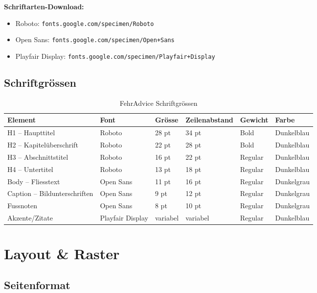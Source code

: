 \textbf{Schriftarten-Download:}
\begin{itemize}
    \item Roboto: \texttt{fonts.google.com/specimen/Roboto}
    \item Open Sans: \texttt{fonts.google.com/specimen/Open+Sans}
    \item Playfair Display: \texttt{fonts.google.com/specimen/Playfair+Display}
\end{itemize}

\subsection{Schriftgrössen}

\begin{table}[h]
\centering
\caption{FehrAdvice Schriftgrössen}
\label{tab:font-sizes}
\begin{tabular}{llllll}
\toprule
\textbf{Element} & \textbf{Font} & \textbf{Grösse} & \textbf{Zeilenabstand} & \textbf{Gewicht} & \textbf{Farbe} \\
\midrule
H1 – Haupttitel & Roboto & 28 pt & 34 pt & Bold & Dunkelblau \\
H2 – Kapitelüberschrift & Roboto & 22 pt & 28 pt & Bold & Dunkelblau \\
H3 – Abschnittstitel & Roboto & 16 pt & 22 pt & Regular & Dunkelblau \\
H4 – Untertitel & Roboto & 13 pt & 18 pt & Regular & Dunkelblau \\
Body – Fliesstext & Open Sans & 11 pt & 16 pt & Regular & Dunkelgrau \\
Caption – Bildunterschriften & Open Sans & 9 pt & 12 pt & Regular & Dunkelgrau \\
Fussnoten & Open Sans & 8 pt & 10 pt & Regular & Dunkelgrau \\
Akzente/Zitate & Playfair Display & variabel & variabel & Regular & Dunkelblau \\
\bottomrule
\end{tabular}
\end{table}


\section{Layout \& Raster}
\label{sec:sg-layout}

\subsection{Seitenformat}

